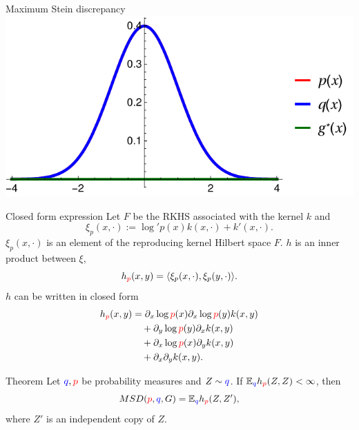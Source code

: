 \begin{frame}
\begin{columns}
\begin{column}{.33\linewidth}
\begin{block}{Maximum Stein discrepancy}
\includegraphics[scale=1.2]{../../presentation/img/s0.pdf}
\end{block}



\vspace{-0.75cm}
\begin{block}{Closed form expression}
 Let $F$ be the RKHS associated with the kernel $k$ and 
\large
 \begin{equation*}
\xi_{p}(x,\cdot):=\log' p(x) k(x,\cdot)+  k'(x,\cdot).
\end{equation*}
 $\xi_{p}(x,\cdot)$ is an element of the reproducing kernel Hilbert
space $F$.  $h$ is an  inner product between $\xi$, 
\[
h_{{\color{red} p}}(x,y)   = \langle\xi_{p}(x,\cdot),\xi_{p}(y,\cdot)\rangle. 
\]
$h$ can be written in closed form
\large
\begin{align*}
h_{{\color{red} p}}(x,y) & = \partial_{x} \log {\color{red} p}(x) \partial_{x} \log {\color{red} p}(y) k(x,y)\\
 & \quad+\partial_{y} \log {\color{red} p}(y) \partial_{x}  k(x,y)\\
 & \quad+\partial_{x} \log {\color{red} p}(x) \partial_{y}k(x,y)\\
 & \quad+\partial_{x} \partial_{y} k(x,y).
\end{align*}
\end{block}

\vspace{-0.75cm}

\begin{block}{Theorem}
\large
Let ${ \color{blue} q},{\color{red} p}$ be probability measures and $Z\sim { \color{blue} q}$. 
If $\mathbb{E}_{{ \color{blue} q}} h_{{\color{red} p}}(Z,Z)<\infty$, then 
$$MSD({\color{red} p},{ \color{blue} q},G) = \mathbb{E}_{{ \color{blue} q}} h_{{\color{red} p}}(Z,Z'),$$
where $Z'$ is an independent copy of $Z$.
\end{block}



\end{column}
\end{columns}
\end{frame}
